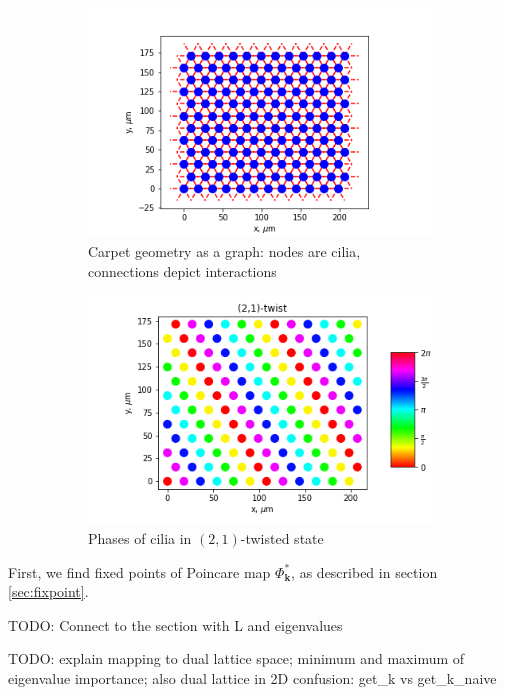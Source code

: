 \documentclass[a4paper,10pt]{article}
\renewcommand*{\vec}[1]{\mathbf{#1}}
\newcommand*{\FP}{\Phi^*}%
\begin{document}
\begin{figure}[h]
\begin{subfigure}[h]{.55\textwidth}
  \centering
 \includegraphics[width=.9\textwidth]{assets/theory-2019-09-05-115736205-2a1.png}
  \caption{Carpet geometry as a graph: nodes are cilia, connections depict interactions}
\end{subfigure}
\begin{subfigure}[h]{.55\textwidth}
  \centering
  \includegraphics[width=.9\textwidth]{assets/theory-2019-09-05-120537244-7e6.png}
  \caption{Phases of cilia in $(2,1)$-twisted state}
\end{subfigure}
\caption{}
 \label{fig:12-geom}
\end{figure}

First, we find fixed points of Poincare map $\FP_{\vec{k}}$, as described in section \ref{sec:fixpoint}.


TODO: Connect to the section with L and eigenvalues

TODO: explain mapping to dual lattice space; minimum and maximum of eigenvalue importance; also dual lattice in 2D confusion: get\_k vs get\_k\_naive
\end{document}
